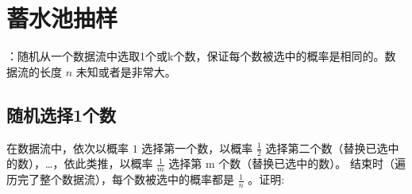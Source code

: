 \documentclass[letterpaper,10pt,english]{sphinxmanual}
\begin{document}
\section{蓄水池抽样}
\label{\detokenize{mathematicsAlgorithm/06_randomSample::doc}}\label{\detokenize{mathematicsAlgorithm/06_randomSample:id1}}
 ：随机从一个数据流中选取1个或k个数，保证每个数被选中的概率是相同的。数据流的长度 \(n\) 未知或者是非常大。


\subsection{随机选择1个数}
\label{\detokenize{mathematicsAlgorithm/06_randomSample:id2}}
在数据流中，依次以概率 \(1\) 选择第一个数，以概率 \(\frac{1}{2}\) 选择第二个数（替换已选中的数），…，依此类推，以概率 \(\frac{1}{m}\) 选择第 m 个数（替换已选中的数）。
结束时（遍历完了整个数据流），每个数被选中的概率都是 \(\frac{1}{n}\) 。证明:

%
\begin{sphinxVerbatim}[commandchars=\\\{\}]
        
\end{sphinxVerbatim}
\end{document}
